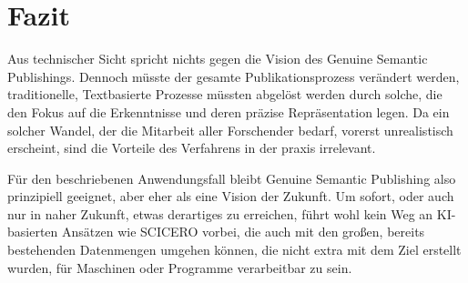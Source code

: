 \section{Fazit}
\label{sec:fazit}

Aus technischer Sicht spricht nichts gegen die Vision des Genuine Semantic Publishings.
Dennoch müsste der gesamte Publikationsprozess verändert werden, traditionelle, Textbasierte Prozesse müssten abgelöst werden durch solche, die den Fokus auf die Erkenntnisse und deren präzise Repräsentation legen.
Da ein solcher Wandel, der die Mitarbeit aller Forschender bedarf, vorerst unrealistisch erscheint, sind die Vorteile des Verfahrens in der praxis irrelevant.

Für den beschriebenen Anwendungsfall bleibt Genuine Semantic Publishing also prinzipiell geeignet, aber eher als eine Vision der Zukunft.
Um sofort, oder auch nur in naher Zukunft, etwas derartiges zu erreichen, führt wohl kein Weg an KI-basierten Ansätzen wie SCICERO vorbei, die auch mit den großen, bereits bestehenden Datenmengen umgehen können, die nicht extra mit dem Ziel erstellt wurden, für Maschinen oder Programme verarbeitbar zu sein.

